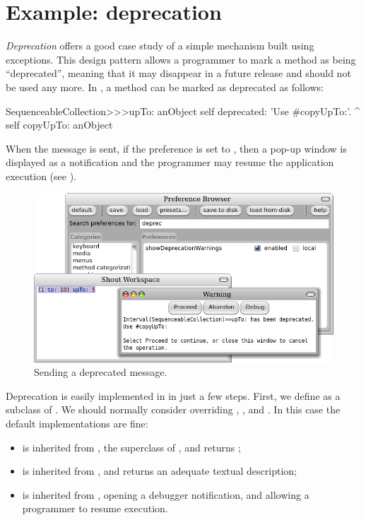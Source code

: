 \documentclass[a4paper,10pt,twoside]{book}
\begin{document}
\section{Example: deprecation}

\emph{Deprecation} offers a good case study of a simple mechanism built using exceptions.
This design pattern allows a programmer to mark a method as being ``deprecated'', meaning that it may disappear in a future release and should not be used any more. In \pharo, a method can be marked as deprecated as follows:

\begin{code}{}
SequenceableCollection>>>upTo: anObject
	self deprecated: 'Use #copyUpTo:'.
	^ self copyUpTo: anObject
\end{code}

When the message  is sent, if the  preference is set to , then a pop-up window is displayed as a notification and the programmer may resume the application execution (see ).


\begin{figure}[ht]\centering
        \includegraphics[width=.8\linewidth]{Deprecation}
        \caption{Sending a deprecated message.}
\end{figure}

Deprecation is easily implemented in \pharo in just a few steps.
First, we define  as a subclass of .
We should normally consider overriding , , and . In this case the default implementations are fine:

\begin{itemize}
\item {} is inherited from , the superclass of , and returns ;
\item {} is inherited from , and returns an adequate textual description;
\item {} is inherited from , opening a debugger notification, and allowing a programmer to resume execution.
\end{itemize}
\end{document}
